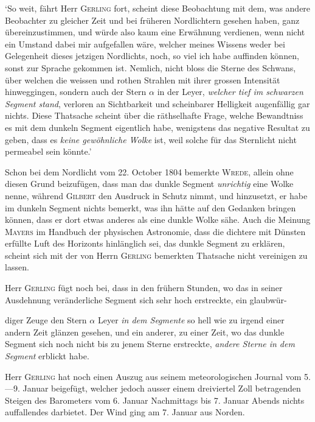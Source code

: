 ‘So weit, fährt Herr \textsc{Gerling} fort, scheint diese Beobachtung mit dem, was andere Beobachter zu gleicher Zeit und bei früheren Nordlichtern gesehen haben, ganz übereinzustimmen, und würde also kaum eine Erwähnung verdienen, wenn nicht ein Umstand dabei mir aufgefallen wäre, welcher meines Wissens weder bei Gelegenheit dieses jetzigen Nordlichts, noch, so viel ich habe auffinden können, sonst zur Sprache gekommen ist. Nemlich, nicht bloss die Sterne des Schwans, über welchen die weissen und rothen Strahlen mit ihrer grossen Intensität hinweggingen, sondern auch der Stern $\alpha$ in der Leyer, \textit{welcher tief im schwarzen Segment stand}, verloren an Sichtbarkeit und scheinbarer Helligkeit augenfällig gar nichts. Diese Thatsache scheint über die räthselhafte Frage, welche Bewandtniss es mit dem dunkeln Segment eigentlich habe, wenigstens das negative Resultat zu geben, dass es \textit{keine gewöhnliche Wolke} ist, weil solche für das Sternlicht nicht permeabel sein könnte.’

Schon bei dem Nordlicht vom 22. October 1804 bemerkte \textsc{Wrede}, allein ohne diesen Grund beizufügen, dass man das dunkle Segment \textit{unrichtig} eine Wolke nenne, während \textsc{Gilbert} den Ausdruck in Schutz nimmt, und hinzusetzt, er habe im dunkeln Segment nichts bemerkt, was ihn hätte auf den Gedanken bringen können, dass er dort etwas anderes als eine dunkle Wolke sähe. Auch die Meinung \textsc{Mayers} im Handbuch der physischen Astronomie, dass die dichtere mit Dünsten erfüllte Luft des Horizonts hinlänglich sei, das dunkle Segment zu erklären, scheint sich mit der von Herrn \textsc{Gerling} bemerkten Thatsache nicht vereinigen zu lassen.

Herr \textsc{Gerling} fügt noch bei, dass in den frühern Stunden, wo das in seiner Ausdehnung veränderliche Segment sich sehr hoch erstreckte, ein glaubwür-
\par\clearpage
{}
\noindent diger Zeuge den Stern $\alpha$ Leyer \textit{in dem Segmente} so hell wie zu irgend einer andern Zeit glänzen gesehen, und ein anderer, zu einer Zeit, wo das dunkle Segment sich noch nicht bis zu jenem Sterne erstreckte, \textit{andere Sterne in dem Segment} erblickt habe.

Herr \textsc{Gerling} hat noch einen Auszug aus seinem meteorologischen Journal vom 5.—9. Januar beigefügt, welcher jedoch ausser einem dreiviertel Zoll betragenden Steigen des Barometers vom 6. Januar Nachmittags bis 7. Januar Abends nichts auffallendes darbietet. Der Wind ging am 7. Januar aus Norden.

